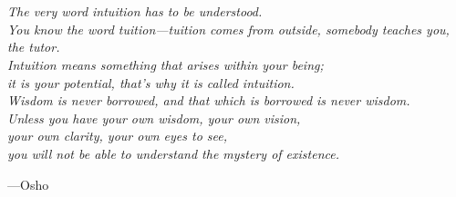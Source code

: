 \newpage



\thispagestyle{empty}

\begin{center}
	\vspace*{8cm}
	{\fontsize{32}{40} } \\[3mm]
	{\fontsize{32}{40} } \\[4.5mm]
\end{center}

\newpage


\thispagestyle{empty}

\begin{center}
	\vspace*{6cm}
	\textit{The very word intuition has to be understood. \\[5mm]
		You know the word tuition---tuition comes from outside, somebody teaches you, the tutor. \\[5mm]
		Intuition means something that arises within your being; \\[5mm]
		it is your potential, that’s why it is called intuition. \\[5mm]
		Wisdom is never borrowed, and that which is borrowed is never wisdom. \\[5mm]
		Unless you have your own wisdom, your own vision, \\[5mm]
		your own clarity, your own eyes to see, \\[5mm]
		you will not be able to understand the mystery of existence.}
\end{center}
\begin{flushright}
	---Osho
\end{flushright}

\newpage

